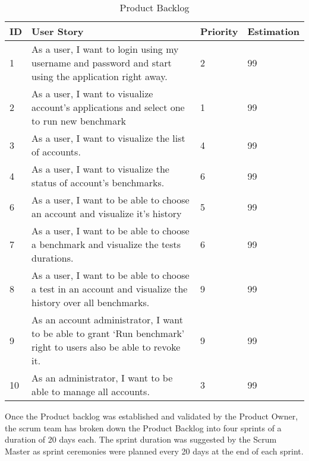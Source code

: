 \begin{table}[!hp]
\caption{Product Backlog}
\label{product-backlog}
\centering
  \begin{tabular}{ | p{2cm}  | p{7cm}  | p{2cm} | p{2cm}| }
    \hline

    ID & User Story                                                                                                        & Priority        & Estimation\\ \hline

    1 & As a user, I want to login using my username and password and start using the application right away.              & 2              & 99        \\ \hline
    2 & As a user, I want to visualize account’s applications and select one to run new benchmark                          & 1              & 99        \\ \hline
    3 & As a user, I want to visualize the list of accounts.                                                               & 4              & 99        \\ \hline
    4 & As a user, I want to visualize the status of account’s benchmarks.                                                 & 6              & 99        \\ \hline
    6 & As a user, I want to be able to choose an account and visualize it’s history                                       & 5              & 99        \\ \hline
    7 & As a user, I want to be able to choose a benchmark and visualize the tests durations.                              & 6              & 99        \\ \hline
    8 & As a user, I want to be able to choose a test in an account and visualize the history over all benchmarks.         & 9              & 99        \\ \hline
    9 & As an account administrator, I want to be able to grant ‘Run benchmark’  right to users also be able to revoke it. & 9              & 99        \\ \hline
    10 & As an administrator, I want to be able to manage all accounts.                                                    & 3              & 99        \\ \hline

    \hline
  \end{tabular}
\end{table}

Once the Product backlog was established and validated by the Product Owner, the
scrum team has broken down the Product Backlog into four sprints of a duration
of 20 days each. The sprint duration was suggested by the Scrum Master as sprint
ceremonies were planned every 20 days at the end of each sprint.


